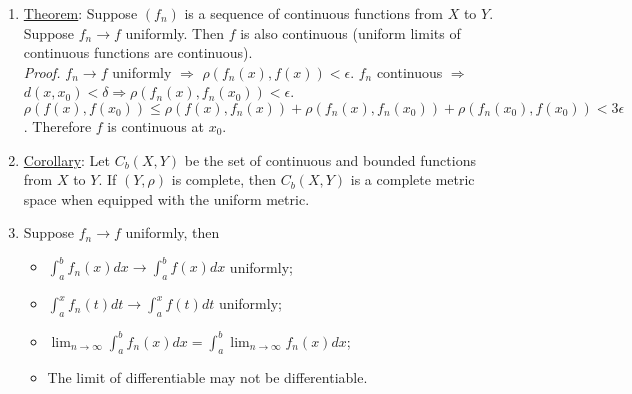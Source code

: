 \documentclass[%
 aip,
 jmp,%
 amsmath,amssymb,
 reprint,%
]{revtex4-1}
\def\d{\delta}
\def\e{\epsilon}
\def\r{\rho}
\def\rai{\rightarrow\infty}
\def\Ra{\Rightarrow}
\renewenvironment{proof}{\color{gray}\footnotesize\emph{Proof.}}{}
\newcommand{\defn}[1]{\underline{#1}}
\begin{document}
\begin{enumerate}
    \item \defn{Theorem}: Suppose $(f_n)$ is a sequence of continuous functions
    from $X$ to $Y$. Suppose $f_n \to f$ uniformly. Then $f$ is also continuous
    (uniform limits of continuous functions are continuous). \\
    \begin{proof}
      $f_n \to f$ uniformly $\Ra$ $\rho(f_n(x), f(x))<\e$.
      $f_n$ continuous $\Ra$ $d(x,x_0) < \d \Ra \rho(f_n(x), f_n(x_0)) < \e$.
      $\r(f(x), f(x_0)) \le \r(f(x), f_n(x)) + \r(f_n(x), f_n(x_0)) +
      \r(f_n(x_0), f(x_0)) < 3\e$. Therefore $f$ is continuous at $x_0$.
    \end{proof}

    \item \defn{Corollary}: Let $C_b(X,Y)$ be the set of continuous and bounded
    functions from $X$ to $Y$. If $(Y,\rho)$ is complete, then $C_b(X,Y)$ is a
    complete metric space when equipped with the uniform metric.

    \item Suppose $f_n \to f$ uniformly, then
        \begin{itemize}
            \item $\int_a^b f_n(x) dx \to \int_a^b f(x) dx$ uniformly;
            \item $\int_a^x f_n(t) dt \to \int_a^x f(t) dt$ uniformly;
            \item $\lim_{n\rai} \int_a^b f_n(x)dx = \int_a^b \lim_{n\rai} f_n(x)dx$;
            \item The limit of differentiable may not be differentiable.
        \end{itemize}

\end{enumerate}
\end{document}
